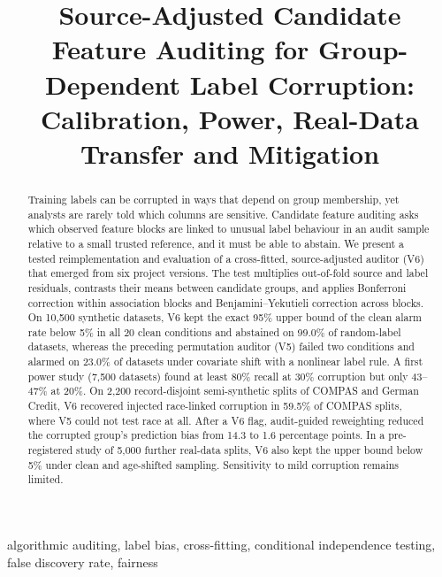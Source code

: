 \documentclass[conference]{IEEEtran}
\newcommand{\Vsix}{V6}
\newcommand{\Vfive}{V5}
\begin{document}
\title{Source-Adjusted Candidate Feature Auditing for Group-Dependent Label Corruption: Calibration, Power, Real-Data Transfer and Mitigation}

\author{
}

\maketitle

\begin{abstract}
Training labels can be corrupted in ways that depend on group membership, yet analysts are rarely told which columns are sensitive. Candidate feature auditing asks which observed feature blocks are linked to unusual label behaviour in an audit sample relative to a small trusted reference, and it must be able to abstain. We present a tested reimplementation and evaluation of a cross-fitted, source-adjusted auditor (\Vsix) that emerged from six project versions. The test multiplies out-of-fold source and label residuals, contrasts their means between candidate groups, and applies Bonferroni correction within association blocks and Benjamini--Yekutieli correction across blocks. On 10,500 synthetic datasets, \Vsix{} kept the exact 95\% upper bound of the clean alarm rate below 5\% in all 20 clean conditions and abstained on 99.0\% of random-label datasets, whereas the preceding permutation auditor (\Vfive) failed two conditions and alarmed on 23.0\% of datasets under covariate shift with a nonlinear label rule. A first power study (7,500 datasets) found at least 80\% recall at 30\% corruption but only 43--47\% at 20\%. On 2,200 record-disjoint semi-synthetic splits of COMPAS and German Credit, \Vsix{} recovered injected race-linked corruption in 59.5\% of COMPAS splits, where \Vfive{} could not test race at all. After a \Vsix{} flag, audit-guided reweighting reduced the corrupted group's prediction bias from 14.3 to 1.6 percentage points. In a pre-registered study of 5,000 further real-data splits, \Vsix{} also kept the upper bound below 5\% under clean and age-shifted sampling. Sensitivity to mild corruption remains limited.
\end{abstract}

\begin{IEEEkeywords}
algorithmic auditing, label bias, cross-fitting, conditional independence testing, false discovery rate, fairness
\end{IEEEkeywords}
\end{document}
